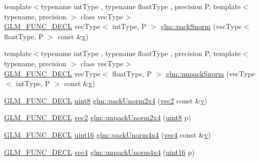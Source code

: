 \begin{DoxyCompactItemize}
\item 
{\footnotesize template$<$typename int\+Type , typename float\+Type , precision P, template$<$ typename, precision $>$ class vec\+Type$>$ }\\\mbox{\hyperlink{setup_8hpp_ab2d052de21a70539923e9bcbf6e83a51}{G\+L\+M\+\_\+\+F\+U\+N\+C\+\_\+\+D\+E\+CL}} vec\+Type$<$ int\+Type, P $>$ \mbox{\hyperlink{group__gtc__packing_ga1be760860697db386b36513aeafe9d5e}{glm\+::pack\+Snorm}} (vec\+Type$<$ float\+Type, P $>$ const \&\mbox{\hyperlink{glad_8h_a14cfbe2fc2234f5504618905b69d1e06}{v}})
\item 
{\footnotesize template$<$typename int\+Type , typename float\+Type , precision P, template$<$ typename, precision $>$ class vec\+Type$>$ }\\\mbox{\hyperlink{setup_8hpp_ab2d052de21a70539923e9bcbf6e83a51}{G\+L\+M\+\_\+\+F\+U\+N\+C\+\_\+\+D\+E\+CL}} vec\+Type$<$ float\+Type, P $>$ \mbox{\hyperlink{group__gtc__packing_ga63eeec0d416e48462f341f4a7a9a45fe}{glm\+::unpack\+Snorm}} (vec\+Type$<$ int\+Type, P $>$ const \&\mbox{\hyperlink{glad_8h_a14cfbe2fc2234f5504618905b69d1e06}{v}})
\item 
\mbox{\hyperlink{setup_8hpp_ab2d052de21a70539923e9bcbf6e83a51}{G\+L\+M\+\_\+\+F\+U\+N\+C\+\_\+\+D\+E\+CL}} \mbox{\hyperlink{group__gtc__type__precision_ga1a7dcd8aac97cc8020817c94049deff2}{uint8}} \mbox{\hyperlink{group__gtc__packing_gad68eb2f848ba867192b8787998c0595a}{glm\+::pack\+Unorm2x4}} (\mbox{\hyperlink{group__core__types_gaa1618f51db67eaa145db101d8c8431d8}{vec2}} const \&\mbox{\hyperlink{glad_8h_a14cfbe2fc2234f5504618905b69d1e06}{v}})
\item 
\mbox{\hyperlink{setup_8hpp_ab2d052de21a70539923e9bcbf6e83a51}{G\+L\+M\+\_\+\+F\+U\+N\+C\+\_\+\+D\+E\+CL}} \mbox{\hyperlink{group__core__types_gaa1618f51db67eaa145db101d8c8431d8}{vec2}} \mbox{\hyperlink{group__gtc__packing_ga3afb0452954320f2d83fe6f38cb24147}{glm\+::unpack\+Unorm2x4}} (\mbox{\hyperlink{group__gtc__type__precision_ga1a7dcd8aac97cc8020817c94049deff2}{uint8}} p)
\item 
\mbox{\hyperlink{setup_8hpp_ab2d052de21a70539923e9bcbf6e83a51}{G\+L\+M\+\_\+\+F\+U\+N\+C\+\_\+\+D\+E\+CL}} \mbox{\hyperlink{group__gtc__type__precision_gad8c2939e1fdd8e5828b31d95c52255d5}{uint16}} \mbox{\hyperlink{group__gtc__packing_gad493c9f130e91dd8a4b360b05dcea573}{glm\+::pack\+Unorm4x4}} (\mbox{\hyperlink{group__core__types_ga5881b1b022d7fd1b7218f5916532dd02}{vec4}} const \&\mbox{\hyperlink{glad_8h_a14cfbe2fc2234f5504618905b69d1e06}{v}})
\item 
\mbox{\hyperlink{setup_8hpp_ab2d052de21a70539923e9bcbf6e83a51}{G\+L\+M\+\_\+\+F\+U\+N\+C\+\_\+\+D\+E\+CL}} \mbox{\hyperlink{group__core__types_ga5881b1b022d7fd1b7218f5916532dd02}{vec4}} \mbox{\hyperlink{group__gtc__packing_ga38a0a518d53e15a9481c31dc1e574a40}{glm\+::unpack\+Unorm4x4}} (\mbox{\hyperlink{group__gtc__type__precision_gad8c2939e1fdd8e5828b31d95c52255d5}{uint16}} p)

\end{DoxyCompactItemize}
